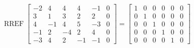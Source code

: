 \begin{exerciseAnswer} 


\[\operatorname{RREF} \left[\begin{array}{ccccc|c}
-2 & 4 & 4 & 4 & -1 & 0 \\
3 & 1 & 3 & 2 & 2 & 0 \\
4 & -1 & 4 & 5 & -3 & 0 \\
-1 & 2 & -4 & 2 & 4 & 0 \\
-3 & 4 & 2 & -1 & -1 & 0
\end{array}\right] = \left[\begin{array}{ccccc|c}
1 & 0 & 0 & 0 & 0 & 0 \\
0 & 1 & 0 & 0 & 0 & 0 \\
0 & 0 & 1 & 0 & 0 & 0 \\
0 & 0 & 0 & 1 & 0 & 0 \\
0 & 0 & 0 & 0 & 1 & 0
\end{array}\right] \]



\end{exerciseAnswer}

